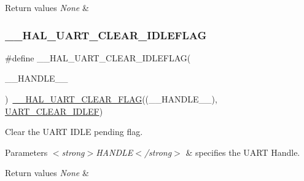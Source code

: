 \begin{DoxyRetVals}{Return values}
{\em None} & \\
\hline
\end{DoxyRetVals}
\mbox{\label{group___u_a_r_t___exported___macros_ga1345aa0af53d82269b13835c225e91d0}} 
\subsubsection{\texorpdfstring{\_\_HAL\_UART\_CLEAR\_IDLEFLAG}{\_\_HAL\_UART\_CLEAR\_IDLEFLAG}}
{\footnotesize\ttfamily \#define \+\_\+\+\_\+\+H\+A\+L\+\_\+\+U\+A\+R\+T\+\_\+\+C\+L\+E\+A\+R\+\_\+\+I\+D\+L\+E\+F\+L\+AG(\begin{DoxyParamCaption}\item[{}]{\+\_\+\+\_\+\+H\+A\+N\+D\+L\+E\+\_\+\+\_\+ }\end{DoxyParamCaption})~\mbox{\hyperlink{group___u_a_r_t___exported___macros_ga9bd035161d41cde4f2568c7af06493bf}{\+\_\+\+\_\+\+H\+A\+L\+\_\+\+U\+A\+R\+T\+\_\+\+C\+L\+E\+A\+R\+\_\+\+F\+L\+AG}}((\+\_\+\+\_\+\+H\+A\+N\+D\+L\+E\+\_\+\+\_\+), \mbox{\hyperlink{group___u_a_r_t___i_t___c_l_e_a_r___flags_ga75ee9be0ac2236931ef3d9514e7dedf4}{U\+A\+R\+T\+\_\+\+C\+L\+E\+A\+R\+\_\+\+I\+D\+L\+EF}})}



Clear the U\+A\+RT I\+D\+LE pending flag. 


\begin{DoxyParams}{Parameters}
{\em $<$strong$>$\+H\+A\+N\+D\+L\+E$<$/strong$>$} & specifies the U\+A\+RT Handle. \\
\hline
\end{DoxyParams}

\begin{DoxyRetVals}{Return values}
{\em None} & \\
\hline
\end{DoxyRetVals}
\mbox{\label{group___u_a_r_t___exported___macros_gaa81e0f2503bd2a699e7e478507946bb2}} 
